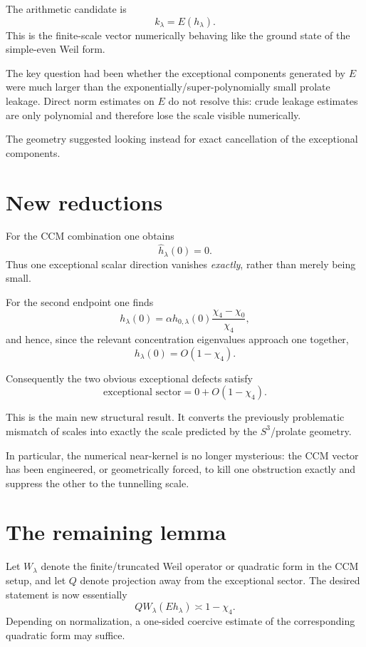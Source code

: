 \documentclass[11pt]{article}
\begin{document}
The arithmetic candidate is
\[
        k_\lambda=E(h_\lambda).
\]
This is the finite-scale vector numerically behaving like the ground
state of the simple-even Weil form.

The key question had been whether the exceptional components generated
by \(E\) were much larger than the exponentially/super-polynomially
small prolate leakage.  Direct norm estimates on \(E\) do not resolve
this: crude leakage estimates are only polynomial and therefore lose
the scale visible numerically.

The geometry suggested looking instead for exact cancellation of the
exceptional components.

\section{New reductions}

For the CCM combination one obtains
\[
        \boxed{\widehat h_\lambda(0)=0.}
\]
Thus one exceptional scalar direction vanishes \emph{exactly}, rather
than merely being small.

For the second endpoint one finds
\[
 h_\lambda(0)
 =
 \alpha h_{0,\lambda}(0)
 \frac{\chi_4-\chi_0}{\chi_4},
\]
and hence, since the relevant concentration eigenvalues approach one
together,
\[
        \boxed{h_\lambda(0)=O(1-\chi_4).}
\]

Consequently the two obvious exceptional defects satisfy
\[
\boxed{
\text{exceptional sector}
=
0+O(1-\chi_4).
}
\]

This is the main new structural result.  It converts the previously
problematic mismatch of scales into exactly the scale predicted by the
\(S^3\)/prolate geometry.

In particular, the numerical near-kernel is no longer mysterious:
the CCM vector has been engineered, or geometrically forced, to kill
one obstruction exactly and suppress the other to the tunnelling scale.

\section{The remaining lemma}

Let \(W_\lambda\) denote the finite/truncated Weil operator or quadratic
form in the CCM setup, and let \(Q\) denote projection away from the
exceptional sector.  The desired statement is now essentially
\[
        \boxed{
        QW_\lambda(Eh_\lambda)
        \asymp
        1-\chi_4.
        }
        \tag{*}
\]
Depending on normalization, a one-sided coercive estimate of the
corresponding quadratic form may suffice.
\end{document}
